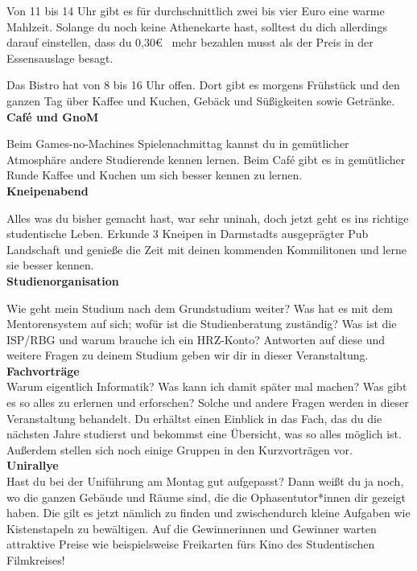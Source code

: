 {    Von 11 bis 14 Uhr gibt es für durchschnittlich zwei bis vier Euro eine warme Mahlzeit. Solange du noch keine Athenekarte hast, solltest du dich allerdings darauf einstellen, dass du 0,30\euro~ mehr bezahlen musst als der Preis in der Essensauslage besagt.

    Das Bistro hat von 8 bis 16 Uhr offen. Dort gibt es morgens Frühstück und den ganzen Tag über Kaffee und Kuchen, Gebäck und Süßigkeiten sowie Getränke.\\

    \noindent\textbf{Caf\'e und GnoM}

    Beim Games-no-Machines Spielenachmittag kannst du in gemütlicher Atmosphäre andere Studierende kennen lernen. Beim Caf\'e gibt es in gemütlicher Runde Kaffee und Kuchen um sich besser kennen zu lernen.\\

    \noindent\textbf{Kneipenabend}

    Alles was du bisher gemacht hast, war sehr uninah, doch jetzt geht es ins richtige studentische Leben.
    Erkunde 3 Kneipen in Darmstadts ausgeprägter Pub Landschaft und genieße die Zeit mit deinen kommenden Kommilitonen und lerne sie besser kennen. \\
    \newpage
    \noindent\textbf{Studienorganisation}

    Wie geht mein Studium nach dem Grundstudium weiter? Was hat es mit dem Mentorensystem auf sich; wofür ist die Studienberatung zuständig? Was ist die ISP/RBG und warum  brauche ich ein HRZ-Konto? Antworten auf diese und weitere Fragen zu deinem Studium geben wir dir in dieser Veranstaltung.\\

    \noindent\textbf{Fachvorträge}\\
    Warum eigentlich Informatik? Was kann ich damit später mal machen? Was gibt es so alles zu erlernen und erforschen? Solche und andere Fragen werden in dieser Veranstaltung behandelt. Du erhältst einen Einblick in das Fach, das du die nächsten Jahre studierst und bekommst eine Übersicht, was so alles möglich ist. Außerdem stellen sich noch einige Gruppen in den Kurzvorträgen vor.\\

    \noindent\textbf{Unirallye}\\
    Hast du bei der Uniführung am Montag gut aufgepasst? Dann weißt du ja noch, wo die ganzen Gebäude und Räume sind, die die Ophasentutor*innen dir gezeigt haben. Die gilt es jetzt nämlich zu finden und zwischendurch kleine Aufgaben wie Kistenstapeln zu bewältigen. Auf die Gewinnerinnen und Gewinner warten attraktive Preise wie beispielsweise Freikarten fürs Kino des Studentischen Filmkreises!\\

}
